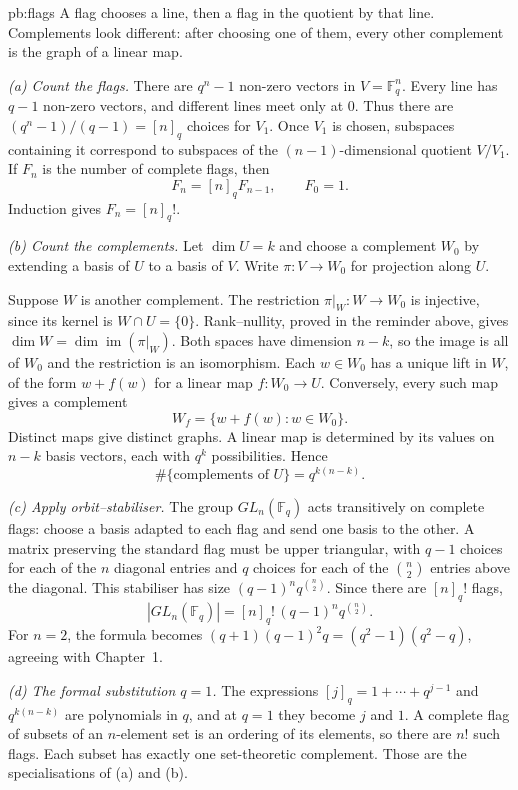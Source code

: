 \begin{solution}{pb:flags}
\idea A flag chooses a line, then a flag in the quotient by that line. Complements look different: after choosing one of them, every other complement is the graph of a linear map.

\writeup \emph{(a) Count the flags.} There are $q^n-1$ non-zero vectors in $V=\mathbb F_q^n$. Every line has $q-1$ non-zero vectors, and different lines meet only at $0$. Thus there are $(q^n-1)/(q-1)=[n]_q$ choices for $V_1$. Once $V_1$ is chosen, subspaces containing it correspond to subspaces of the $(n-1)$-dimensional quotient $V/V_1$. If $F_n$ is the number of complete flags, then
\[
F_n=[n]_q F_{n-1},\qquad F_0=1.
\]
Induction gives $\boxed{F_n=[n]_q!}$.

\emph{(b) Count the complements.} Let $\dim U=k$ and choose a complement $W_0$ by extending a basis of $U$ to a basis of $V$. Write $\pi:V\to W_0$ for projection along $U$.

Suppose $W$ is another complement. The restriction $\pi|_W:W\to W_0$ is injective, since its kernel is $W\cap U=\{0\}$. Rank--nullity, proved in the reminder above, gives $\dim W=\dim\operatorname{im}(\pi|_W)$. Both spaces have dimension $n-k$, so the image is all of $W_0$ and the restriction is an isomorphism. Each $w\in W_0$ has a unique lift in $W$, of the form $w+f(w)$ for a linear map $f:W_0\to U$. Conversely, every such map gives a complement
\[
W_f=\{w+f(w):w\in W_0\}.
\]
Distinct maps give distinct graphs. A linear map is determined by its values on $n-k$ basis vectors, each with $q^k$ possibilities. Hence
\[
\boxed{\#\{\text{complements of }U\}=q^{k(n-k)}.}
\]

\emph{(c) Apply orbit--stabiliser.} The group $GL_n(\mathbb F_q)$ acts transitively on complete flags: choose a basis adapted to each flag and send one basis to the other. A matrix preserving the standard flag must be upper triangular, with $q-1$ choices for each of the $n$ diagonal entries and $q$ choices for each of the $\binom n2$ entries above the diagonal. This stabiliser has size $(q-1)^nq^{\binom n2}$. Since there are $[n]_q!$ flags,
\[
\boxed{|GL_n(\mathbb F_q)|=[n]_q!\,(q-1)^nq^{\binom n2}.}
\]
For $n=2$, the formula becomes $(q+1)(q-1)^2q=(q^2-1)(q^2-q)$, agreeing with Chapter~1.

\emph{(d) The formal substitution $q=1$.} The expressions $[j]_q=1+\cdots+q^{j-1}$ and $q^{k(n-k)}$ are polynomials in $q$, and at $q=1$ they become $j$ and $1$. A complete flag of subsets of an $n$-element set is an ordering of its elements, so there are $n!$ such flags. Each subset has exactly one set-theoretic complement. Those are the specialisations of (a) and (b).


\end{solution}

